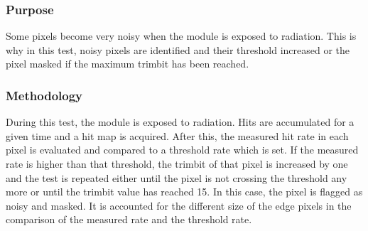 \documentclass[a4paper,12pt,twoside]{article}
\begin{document}
\subsubsection{Purpose}
Some pixels become very noisy when the module is exposed to radiation. This is why in this test, noisy pixels are identified and their threshold increased or the pixel masked if the maximum trimbit has been reached.
\subsubsection{Methodology}
During this test, the module is exposed to radiation. Hits are accumulated for a given time and a hit map is acquired. After this, the measured hit rate in each pixel is evaluated and compared to a threshold rate which is set. If the measured rate is higher than that threshold, the trimbit of that pixel is increased by one and the test is repeated either until the pixel is not crossing the threshold any more or until the trimbit value has reached 15. In this case, the pixel is flagged as noisy and masked. 
It is accounted for the different size of the edge pixels in the comparison of the measured rate and the threshold rate.
\end{document}
